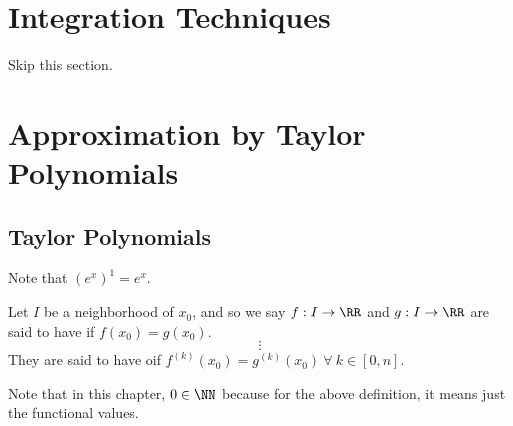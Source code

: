 \documentclass[12pt]{scrartcl}
\begin{document}
\section{Integration Techniques}

Skip this section.

\section{Approximation by Taylor Polynomials}

\subsection{Taylor Polynomials}

\begin{note}
  Note that $(e^x)^1 = e^x$.
\end{note}

\begin{definition}
  Let $I$ be a neighborhood of $x_0$, and so we say $f: I \to \RR$ and $g: I \to \RR$
  are said to have  if $f(x_0) = g(x_0)$. 
  \[\vdots\]
  They are said to have  oif $f^{(k)}(x_0) = g^{(k)}(x_0) \ \forall \ k \in [0, n]$.
\end{definition}

\begin{note}
  Note that in this chapter, $0 \in \NN$ because for the above definition, it means just the functional values.
\end{note}
\end{document}
